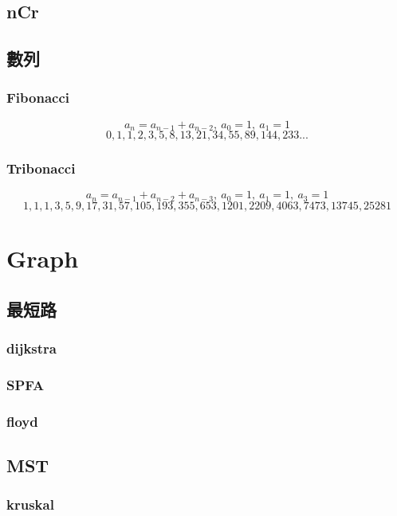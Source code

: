 \subsection{nCr}


\subsection{數列}
\subsubsection{Fibonacci}
\[a_{n} = a_{n-1} + a_{n-2},\ a_0 = 1,\ a_1 = 1\]
\[0, 1, 1, 2, 3, 5, 8, 13, 21, 34, 55, 89, 144, 233...\]

\subsubsection{Tribonacci}
\[a_{n} = a_{n-1} + a_{n-2} + a_{n-3},\ a_0 = 1,\ a_1 = 1,\ a_3 = 1\]
\[1, 1, 1, 3, 5, 9, 17, 31, 57, 105, 193, 355, 653, 1201, 2209, 4063, 7473, 13745, 25281\]

\section{Graph}

\subsection{最短路}
\subsubsection{dijkstra}


\subsubsection{SPFA}


\subsubsection{floyd}


\subsection{MST}
\subsubsection{kruskal}


